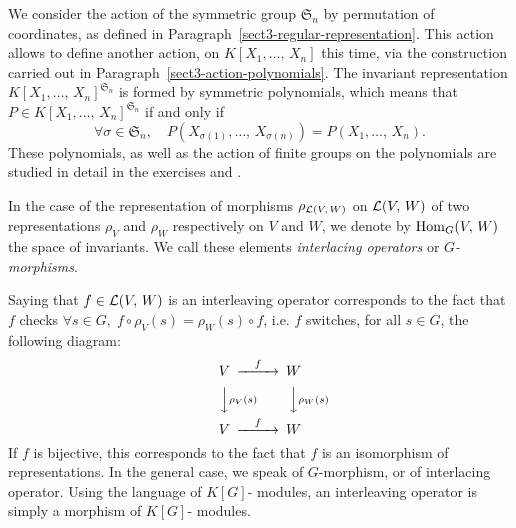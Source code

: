  
\begin{exmp}
    We consider the action of the symmetric group $ \mathfrak{S}_n $ by permutation of coordinates, as defined in Paragraph~\ref{sect3-regular-representation}. This action allows to define another action, on $ K[X_1, \ldots, \, X_n] $ this time, via the construction carried out in Paragraph~\ref{sect3-action-polynomials}. The invariant representation $ K[X_1, \ldots, \, X_n]^{\mathfrak{S}_n} $ is formed by symmetric polynomials, which means that $ P \in K[X_1, \ldots, \, X_n]^{\mathfrak{S}_n} $ if and only if
\begin{equation*}
\forall \sigma \in \mathfrak{S}_n, \quad P (X_{\sigma (1)}, \ldots, \, X_{\sigma (n)}) = P (X_1, \ldots, \, X_n).
\end{equation*}
These polynomials, as well as the action of finite groups on the polynomials are studied in detail in the exercises  and .
\end{exmp}
 
 
\begin{defn}
\label{defn-interlacing-operators}
   \label{notation-81} In the case of the representation of morphisms $ \rho_{\mathcal{L} (V, \, W)} $ on $ \mathcal{L} (V, \, W) $ of two representations $\rho_V $ and $\rho_W $ respectively on $V$ and $ W $, we denote by $\operatorname{Hom}_G(V, \, W ) $ the space of invariants. We call these elements \textit{interlacing operators} or \textit{$G$-morphisms}.
\end{defn}
 
 
\begin{rem}
Saying that $ f \in \mathcal{L} (V, \, W) $ is an interleaving operator corresponds to the fact that $ f $ checks $\forall s \in G, \; f \circ \rho_V (s) = \rho_W (s) \circ f $, i.e. $ f $ switches, for all $ s \in G $, the following diagram:
\begin{equation*}
\begin{CD} V @>{f} >> W \\@VV{\rho_{V} (s)} V @VV{\rho_{W} (s)} V \\V @>{f} >> W \end{CD}
\end{equation*}
If $ f $ is bijective, this corresponds to the fact that $ f $ is an isomorphism of representations. In the general case, we speak of $G$-morphism, or of interlacing operator. Using the language of $ K[G]$- modules, an interleaving operator is simply a morphism of $ K[G]$- modules.
\end{rem}
 
